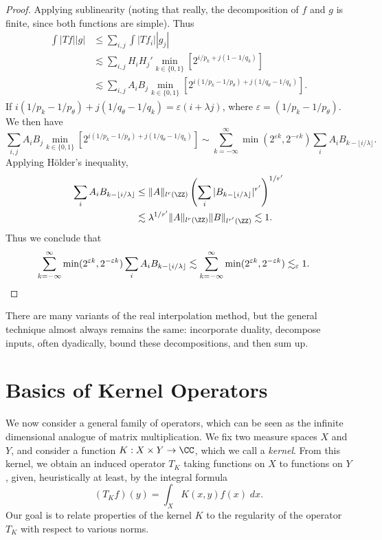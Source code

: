 \begin{proof}
  Applying sublinearity (noting that really, the decomposition of $f$ and $g$ is finite, since both functions are simple). Thus
  \begin{align*}
    \int |Tf| |g| &\leq \sum_{i,j} \int |Tf_i| |g_j|\\
    &\lesssim \sum_{i,j} H_i H_j' \min_{k \in \{0,1\}} \left[ 2^{i/p_k + j(1 - 1/q_k)} \right]\\
    &\lesssim \sum_{i,j} A_i B_j \min_{k \in \{ 0, 1 \}} \left[ 2^{i(1/p_k - 1/p_\theta) + j(1/q_\theta - 1/q_k)} \right].
  \end{align*}
  If $i(1/p_k - 1/p_\theta) + j(1/q_\theta - 1/q_k) = \varepsilon(i + \lambda j)$, where $\varepsilon = (1/p_k - 1/p_\theta)$. We then have
  \[ \sum_{i,j} A_i B_j \min_{k \in \{ 0, 1 \}} \left[ 2^{i(1/p_k - 1/p_\theta) + j(1/q_\theta - 1/q_k)} \right] \sim \sum_{k = -\infty}^\infty \min(2^{\varepsilon k}, 2^{-\varepsilon k}) \sum_i A_i B_{k - \lfloor i/\lambda \rfloor}. \]
  Applying H\"{o}lder's inequality,
  \begin{align*}
    \sum_i A_i B_{k - \lfloor i/\lambda \rfloor} &\leq \| A \|_{l^r(\ZZ)} \left( \sum_i |B_{k - \lfloor i/\lambda \rfloor}|^{r'} \right)^{1/r'}\\
    &\lesssim \lambda^{1/r'} \| A \|_{l^r(\ZZ)} \| B \|_{l^{r'}(\ZZ)} \lesssim 1.
  \end{align*}
  Thus we conclude that
  \begin{align*}
    \sum_{k = -\infty}^\infty \min(2^{\varepsilon k}, 2^{-\varepsilon k}) \sum_i A_i B_{k - \lfloor i/\lambda \rfloor} &\lesssim \sum_{k = -\infty}^\infty \min(2^{\varepsilon k}, 2^{-\varepsilon k}) \lesssim_\varepsilon 1. \qedhere
  \end{align*}
\end{proof}

There are many variants of the real interpolation method, but the general technique almost always remains the same: incorporate duality, decompose inputs, often dyadically, bound these decompositions, and then sum up.










\chapter{Basics of Kernel Operators}

We now consider a general family of operators, which can be seen as the infinite dimensional analogue of matrix multiplication. We fix two measure spaces $X$ and $Y$, and consider a function $K: X \times Y \to \CC$, which we call a \emph{kernel}. From this kernel, we obtain an induced operator $T_K$ taking functions on $X$ to functions on $Y$, given, heuristically at least, by the integral formula
%
\[ (T_K f)(y) = \int_X K(x,y) f(x)\; dx. \]
%
Our goal is to relate properties of the kernel $K$ to the regularity of the operator $T_K$ with respect to various norms.

